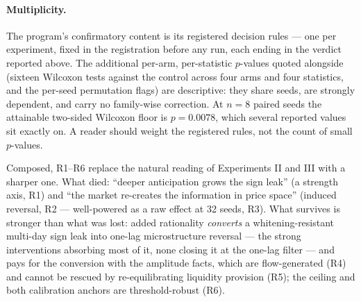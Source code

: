 \documentclass[11pt]{article}
\begin{document}
\paragraph{Multiplicity.}
The program's confirmatory content is its registered decision rules ---
one per experiment, fixed in the registration before any run, each ending
in the verdict reported above. The additional per-arm, per-statistic
$p$-values quoted alongside (sixteen Wilcoxon tests against the control
across four arms and four statistics, and the per-seed permutation
flags) are descriptive: they share seeds, are strongly dependent, and
carry no family-wise correction. At $n = 8$ paired seeds the attainable
two-sided Wilcoxon floor is $p = 0.0078$, which several reported values
sit exactly on. A reader should weight the registered rules, not the
count of small $p$-values.

Composed, R1--R6 replace the natural reading of Experiments II and III
with a sharper one. What died: ``deeper anticipation grows the sign
leak'' (a strength axis, R1) and ``the market re-creates the information
in price space'' (induced reversal, R2 --- well-powered as a raw effect
at 32 seeds, R3). What survives is stronger than what was lost: added
rationality \emph{converts} a whitening-resistant multi-day sign leak into
one-lag microstructure reversal --- the strong interventions absorbing
most of it, none closing it at the one-lag filter --- and pays for the
conversion with the amplitude facts, which are
flow-generated (R4) and cannot be rescued by re-equilibrating liquidity
provision (R5); the ceiling and both calibration anchors are
threshold-robust (R6).
\end{document}
